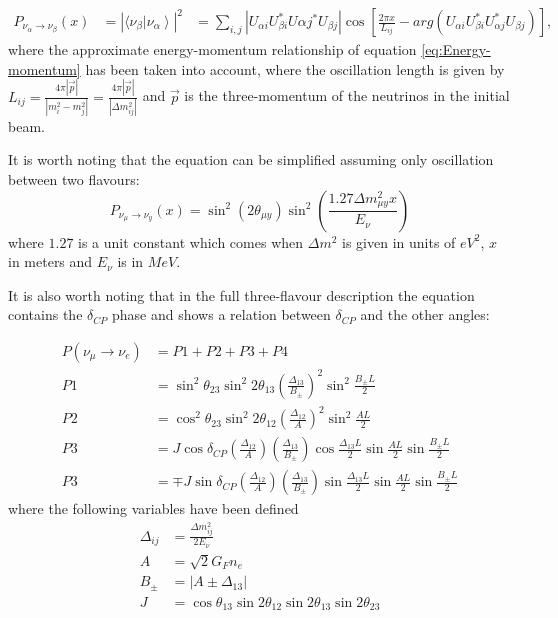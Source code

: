 \begin{equation}
\label{eq:Problength}
\begin{aligned}
P_{\nu_\alpha \rightarrow \nu_\beta} (x) &= \left|  \langle \nu_\beta \left| \nu_\alpha     \right\rangle  \right|^2
& = \sum_{i,j} \left| U_{\alpha i} U_{\beta i}^* U{\alpha j}^* U_{\beta j} \right| \cos\left[\frac{2\pi x}{L_{ij}} -arg(U_{\alpha i} U_{\beta i}^* U_{\alpha j}^* U_{\beta j} ) \right],
\end{aligned}
\end{equation}
where the approximate energy-momentum relationship of equation \ref{eq:Energy-momentum} has been taken into account, where the oscillation length is given by $L_{ij} = \frac{4\pi  \left| \vec{p} \right| }{\left| m_i^2 - m_j^2 \right|}=\frac{4\pi  \left| \vec{p} \right| }{\left| \Delta m_{ij}^2 \right|} $ and $\vec{p}$ is the three-momentum of the neutrinos in the initial beam.

It is worth noting that the equation can be simplified assuming only oscillation between two flavours:
\begin{equation}
P_{\nu_\mu \rightarrow \nu_y} (x) = \sin^2(2\theta_{\mu y})\sin^2 \left( \frac{1.27\Delta m_{\mu y}^2 x}{E_\nu} \right)
\label{eq:twoPNeutrinoosc}
\end{equation}
where $1.27$ is a unit constant which comes when $\Delta m^2$ is given in units of $eV^2$, $x$ in meters and $E_\nu$ is in $MeV$.

It is also worth noting that in the full three-flavour description the equation contains the $\delta_{CP}$ phase and shows a relation between $\delta_{CP}$ and the other angles:

\begin{align}
P(\nu_\mu \rightarrow \nu_e) &= P1 + P2 + P3 + P4 \label{eq:alignThreeFlavour}\\
P1 &= \sin^2 \theta_{23} \sin^2 2\theta_{13} (\frac{\Delta_{13}}{B_\pm})^2 \sin^2 \frac{B_\pm L}{2} \\
P2 &= \cos^2 \theta_{23} \sin^2 2\theta_{12} (\frac{\Delta_{12}}{A})^2 \sin^2 \frac{A L}{2} \\
P3 &= J\cos \delta_{CP} (\frac{\Delta_{12}}{A})(\frac{\Delta_{13}}{B_\pm})\cos \frac{\Delta_{13} L}{2}\sin \frac{A L}{2}\sin \frac{B_\pm L}{2} \\
P3 &= \mp J\sin \delta_{CP} (\frac{\Delta_{12}}{A})(\frac{\Delta_{13}}{B_\pm})\sin \frac{\Delta_{13} L}{2}\sin \frac{A L}{2}\sin \frac{B_\pm L}{2}
\end{align}
where the following variables have been defined
\begin{align}
\Delta_{ij} &= \frac{\Delta m^2_{ij}}{2E_\nu} \\
A &= \sqrt{2} G_F n_e \\
B_\pm &= | A \pm \Delta_{13} | \\
J &= \cos\theta_{13}\sin 2\theta_{12}\sin 2\theta_{13}\sin 2\theta_{23}
\end{align}

